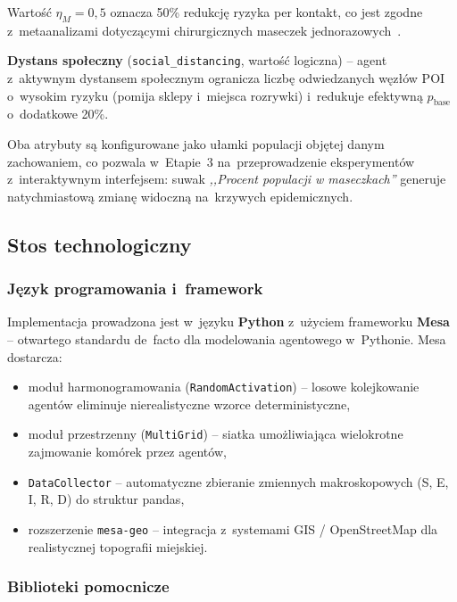 \documentclass[polish]{projectreport}
\begin{document}
\noindent Wartość $\eta_M = 0{,}5$ oznacza 50\% redukcję ryzyka per kontakt,
co jest zgodne z~metaanalizami dotyczącymi chirurgicznych maseczek
jednorazowych~\cite{zhang2020covid}.

\textbf{Dystans społeczny} (\texttt{social\_distancing}, wartość logiczna)
-- agent z~aktywnym dystansem społecznym ogranicza liczbę odwiedzanych węzłów
POI o~wysokim ryzyku (pomija sklepy i~miejsca rozrywki) i~redukuje
efektywną $p_{\text{base}}$ o~dodatkowe 20\%.

Oba atrybuty są konfigurowane jako ułamki populacji objętej danym
zachowaniem, co pozwala w~Etapie~3 na~przeprowadzenie eksperymentów
z~interaktywnym interfejsem: suwak \textit{,,Procent populacji w maseczkach''}
generuje natychmiastową zmianę widoczną na~krzywych epidemicznych.

\subsection{Stos technologiczny}
\label{sec:tech-stack}

\subsubsection{Język programowania i~framework}
\label{sec:mesa}

Implementacja prowadzona jest w~języku \textbf{Python} z~użyciem frameworku
\textbf{Mesa}~\cite{mesa2020} -- otwartego standardu de~facto dla modelowania
agentowego w~Pythonie. Mesa dostarcza:

\begin{itemize}
  \item moduł harmonogramowania (\texttt{RandomActivation}) -- losowe kolejkowanie
        agentów eliminuje nierealistyczne wzorce deterministyczne,
  \item moduł przestrzenny (\texttt{MultiGrid}) -- siatka umożliwiająca
        wielokrotne zajmowanie komórek przez agentów,
  \item \texttt{DataCollector} -- automatyczne zbieranie zmiennych makroskopowych
        (S, E, I, R, D) do struktur pandas,
  \item rozszerzenie \texttt{mesa-geo} -- integracja z~systemami GIS / OpenStreetMap
        dla realistycznej topografii miejskiej.
\end{itemize}

\subsubsection{Biblioteki pomocnicze}
\label{sec:libraries}
\end{document}
